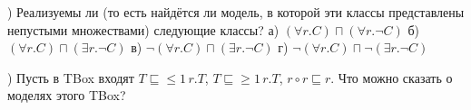 \documentclass[12pt]{article}
\begin{document}
\z) Реализуемы ли (то есть найдётся ли модель, в которой эти классы представлены непустыми множествами)
следующие классы?
а) $(\forall r.C) \sqcap (\forall r.\lnot C)$
б) $(\forall r.C) \sqcap (\exists r.\lnot C)$
в) $\lnot (\forall r.C) \sqcap (\exists r.\lnot C)$
г) $\lnot (\forall r.C) \sqcap \lnot (\exists r.\lnot C)$

\z) Пусть в TBox входят $T\sqsubseteq \leq 1\,r.T$, $T\sqsubseteq \geq 1\,r.T$, $r\circ r\sqsubseteq r$.
Что можно сказать о моделях этого TBox?


\end{document}
